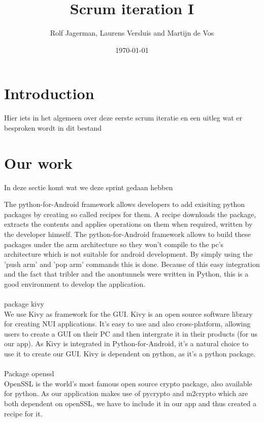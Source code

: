 \documentclass{article}
\title{Scrum iteration I}
\author{Rolf Jagerman, Laurens Versluis and Martijn de Vos}
\date{\today}
\begin{document}
\maketitle

\newpage

\section{Introduction}
Hier iets in het algemeen over deze eerste scrum iteratie en een uitleg wat er besproken wordt in dit bestand

\section{Our work}
In deze sectie komt wat we deze sprint gedaan hebben

The python-for-Android framework allows developers to add exisiting python packages by creating so called recipes for them.
A recipe downloads the package, extracts the contents and applies operations on them when required, written by the developer himself.
The python-for-Android framework allows to build these packages under the arm architecture so they won't compile to the pc's architecture which is not suitable for android development. By simply using the 'push arm' and 'pop arm' commands this is done. Because of this easy integration and the fact that tribler and the anontunnels were written in Python, this is a good environment to develop the application.\\\\

package kivy\\

We use Kivy as framework for the GUI. Kivy is an open source software library for creating NUI applications. It's easy to use and also cross-platform, allowing users to create a GUI on their PC and then intergrate it in their products (for us our app). As Kivy is integrated in Python-for-Android, it's a natural choice to use it to create our GUI. Kivy is dependent on python, as it's a python package. 
\\\\
Package openssl\\

OpenSSL is the world's most famous open source crypto package, also available for python. As our application makes use of pycrypto and m2crypto which are both dependent on openSSL, we have to include it in our app and thus created a recipe for it. \\\\
\end{document}
